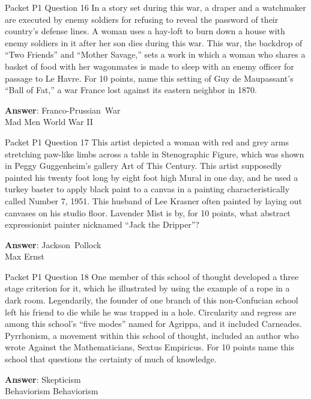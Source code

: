 \begin{frame}{Packet P1 Question 16}
In a story set during this war, a draper and   a watchmaker are executed by enemy soldiers for refusing to reveal the password of their country's   defense lines. A woman uses a hay-loft to burn down a house with enemy soldiers in it after her son dies during this war. This war, the backdrop of ``Two Friends'' and “Mother Savage,” sets a work in which a woman who shares a basket of food with her wagonmates is made to sleep with an enemy officer for passage to Le Havre. For 10 points, name this setting of Guy de Maupassant's ``Ball of Fat,'' a war   France lost against its eastern neighbor in 1870.  

\textbf{Answer}: Franco-Prussian\ War\\
 Mad Men
 World War II
\end{frame}

\begin{frame}{Packet P1 Question 17}
This artist depicted a woman with red and grey arms stretching paw-like limbs across a table in Stenographic Figure, which was shown in Peggy Guggenheim's gallery Art of This Century. This artist supposedly   painted his twenty foot long by eight foot high Mural in one day, and he used a turkey baster to apply black paint to a canvas in a painting characteristically called Number 7, 1951. This husband of Lee Krasner often   painted by laying   out canvases on his studio floor. Lavender Mist is by, for 10     points, what abstract expressionist painter nicknamed ``Jack the Dripper''?

\textbf{Answer}: Jackson\ Pollock\\
 Max Ernst
\end{frame}

\begin{frame}{Packet P1 Question 18}
One member of this school of thought developed a three stage criterion for it, which he illustrated by   using the example of a rope in a dark room. Legendarily, the founder of one branch of this non-Confucian school left his friend to die while he was trapped in a hole. Circularity and regress are among this school’s “five modes” named for Agrippa, and it included Carneades. Pyrrhonism, a movement within this school of thought, included an author who wrote Against the Mathematicians, Sextus Empiricus.   For 10 points name   this school that   questions the certainty of much of knowledge.  

\textbf{Answer}: Skepticism\\
 Behaviorism
 Behaviorism
\end{frame}

